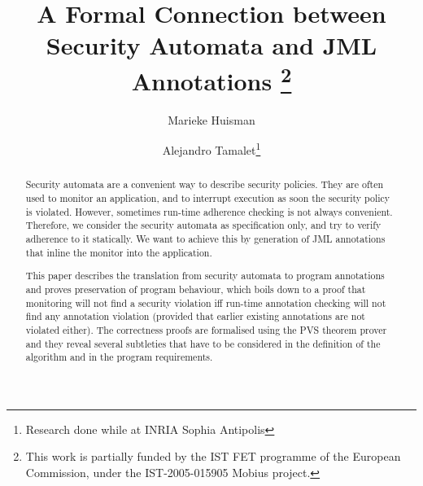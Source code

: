 \documentclass[]{llncs}
\title{A Formal Connection between Security Automata and JML Annotations
\thanks{This work is partially funded by the IST FET
programme of the European Commission, under the IST-2005-015905
\textsf{Mobius} project.}}
\author{Marieke Huisman\inst{1} \and Alejandro Tamalet\inst{2}\thanks{Research done while at INRIA Sophia Antipolis}}
\institute{INRIA Sophia Antipolis, France \and
University of Nijmegen, Netherlands}
\begin{document}
\maketitle
\begin{abstract}
Security automata are a convenient way to describe security
policies. They are often used to monitor an application, and to
interrupt execution as soon the security policy is violated. However,
sometimes run-time adherence checking is not always convenient.
Therefore, we consider the security automata as specification only,
and try to verify adherence to it statically. We want to achieve this by
generation of JML annotations that inline the monitor into the application.

%
This paper describes the translation from security automata to program
annotations and proves preservation of program behaviour, which
boils down to a proof
that monitoring will not find a security violation iff run-time
annotation checking will not find any annotation violation (provided
that earlier existing annotations are not violated either).
%
%
The correctness proofs are formalised using the PVS theorem prover and they
reveal several subtleties that have to be considered in the definition of the
algorithm and in the program requirements.
\end{abstract}











\end{document}
